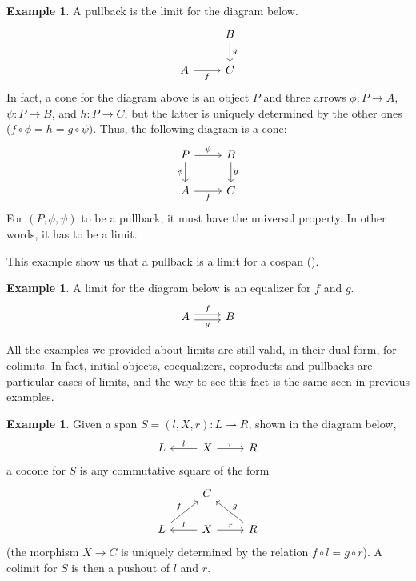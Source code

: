 \documentclass[a4paper, twoside,openright]{report}
\theoremstyle{plain}
\theoremstyle{definition}
\newtheorem{example}[theorem]{Example}
\begin{document}
\begin{example}\label{ex:pb_as_limit}
    A pullback is the limit for the diagram below.
    \[
        \begin{tikzcd}
            & B \arrow[d, "g"] \\
            A \arrow[r, "f" swap] & C
        \end{tikzcd}
    \]
    In fact, a cone for the diagram above is an object $P$ and three arrows $\phi:P \rightarrow A$, $\psi: P \rightarrow B$, and $h: P \rightarrow C$, but the latter is uniquely determined by the other ones ($f \circ \phi = h = g \circ \psi$).
    Thus, the following diagram is a cone:
    \[
        \begin{tikzcd}
            P \arrow[r, "{\psi}"] \arrow[d, "{\phi}" swap] & B \arrow[d, "g"] \\
            A \arrow[r, "f" swap] & C
        \end{tikzcd}
    \]
    For $(P, \phi, \psi)$ to be a pullback, it must have the universal property. In other words, it has to be a limit.

    This example show us that a pullback is a limit for a cospan ().
\end{example}

\begin{example}\label{ex:equaliz_are_limits}
    A limit for the diagram below is an equalizer for $f$ and $g$.
    \[
        \begin{tikzcd}
            A \arrow[r, shift left, "f"] \arrow[r, shift right,"g"swap] & B
        \end{tikzcd}
    \]
\end{example}


All the examples we provided about limits are still valid, in their dual form, for colimits. In fact, initial objects, coequalizers, coproducts and pullbacks are particular cases of limits, and the way to see this fact is the same seen in previous examples.

\begin{example}
    Given a span $S = (l, X, r): L \rightharpoonup R$, shown in the diagram below,
    \[
        \begin{tikzcd}
            L & X \arrow[l, "l"swap] \arrow[r, "r"]& R
        \end{tikzcd}
    \]
    a cocone for $S$ is any commutative square of the form
    \[
        \begin{tikzcd}
            & C & \\
            L \arrow[ur, "f"] &
            X \arrow[l, "l"swap] \arrow[r, "r"]&
            R \arrow[ul, "g" swap]
        \end{tikzcd}
    \]
    (the morphism $X \rightarrow C$ is uniquely determined by the relation $f \circ l = g \circ r$).
    A colimit for $S$ is then a pushout of $l$ and $r$.
\end{example}
\end{document}
